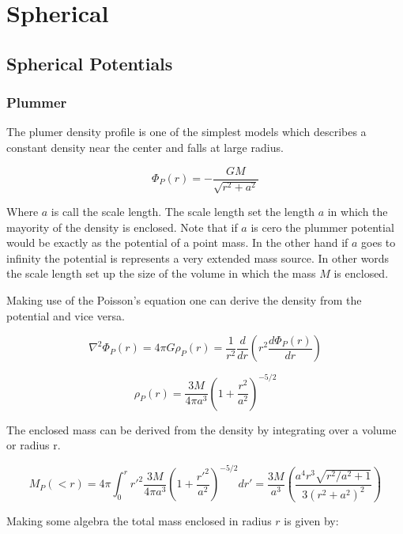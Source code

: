 \chapter{Spherical}
\label{sec:spherical}
\section{Spherical Potentials}

\subsection{Plummer}

The plumer density profile is one of the simplest models which describes
a constant density near the center and falls at large radius.

\begin{equation}
\Phi_P(r) = - \frac{GM}{\sqrt{r^2+a^2}}
\end{equation}


Where $a$ is call the scale length. The scale length set the length $a$ in which the mayority of the density is enclosed. Note
that if $a$ is cero the plummer potential would be exactly as the potential of a point mass.
In the other hand if $a$ goes to infinity the potential is represents a very extended mass source.
In other words the scale length set up the size of the volume in which the mass $M$ is enclosed.

Making use of the Poisson's equation one can derive the density from the potential and vice versa.

\begin{equation}
\nabla ^2 \Phi_P(r) = 4 \pi G \rho_P(r) = \frac{1}{r^2}\frac{d}{dr} \left (  r^2 \frac{d\Phi_P(r)}{dr} \right)
\end{equation}

\begin{equation}
\rho_P (r) = \frac{3M}{4\pi a^3} (1 + \frac{r^2}{a^2})^{-5/2}
\end{equation}


The enclosed mass can be derived from the density by integrating over a volume or radius r.

\begin{equation}
M_P(<r) = 4 \pi \int_0^r r'^2\frac{3M}{4\pi a^3} (1 + \frac{r'^2}{a^2})^{-5/2} dr' = \frac{3M}{a^3} \left( \frac{a^4 r^3 \sqrt{r^2/a^2 + 1}}{3(r^2 + a^2)^2}  \right)
\end{equation}

Making some algebra the total mass enclosed in radius $r$ is 
given by:

